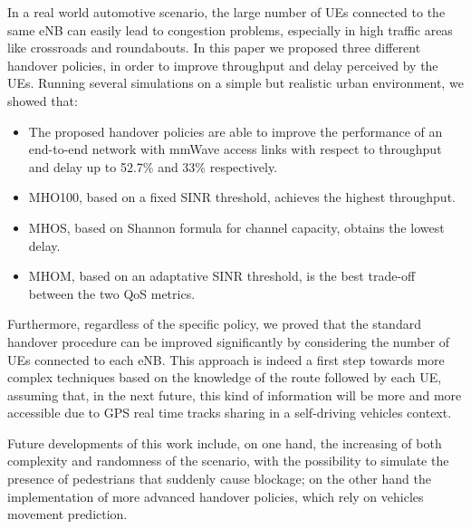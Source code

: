 \documentclass[conference,10pt]{IEEEtran}
\begin{document}
In a real world automotive scenario, the large number of UEs connected to the same eNB can easily lead to congestion problems, especially in high traffic areas like crossroads and roundabouts. In this paper we proposed three different handover policies, in order to improve throughput and delay perceived by the UEs. Running several simulations on a simple but realistic urban environment, we showed that:
\begin{itemize}
\item The proposed handover policies are able to improve the performance of an end-to-end network with mmWave access links with respect to throughput and delay up to 52.7\% and 33\% respectively.
\item MHO100, based on a fixed SINR threshold, achieves the highest throughput.
\item MHOS, based on Shannon formula for channel capacity, obtains the lowest delay.
\item MHOM, based on an adaptative SINR threshold, is the best trade-off between the two QoS metrics.
\end{itemize}
Furthermore, regardless of the specific policy, we proved that the standard handover procedure can be improved significantly by considering the number of UEs connected to each eNB. This approach is indeed a first step towards more complex techniques based on the knowledge of the route followed by each UE, assuming that, in the next future, this kind of information will be more and more accessible due to GPS real time tracks sharing in a self-driving vehicles context.

Future developments of this work include, on one hand, the increasing of both complexity and randomness of the scenario, with the possibility to simulate the presence of pedestrians that suddenly cause blockage; on the other hand the implementation of more advanced handover policies, which rely on vehicles movement prediction.
\end{document}
